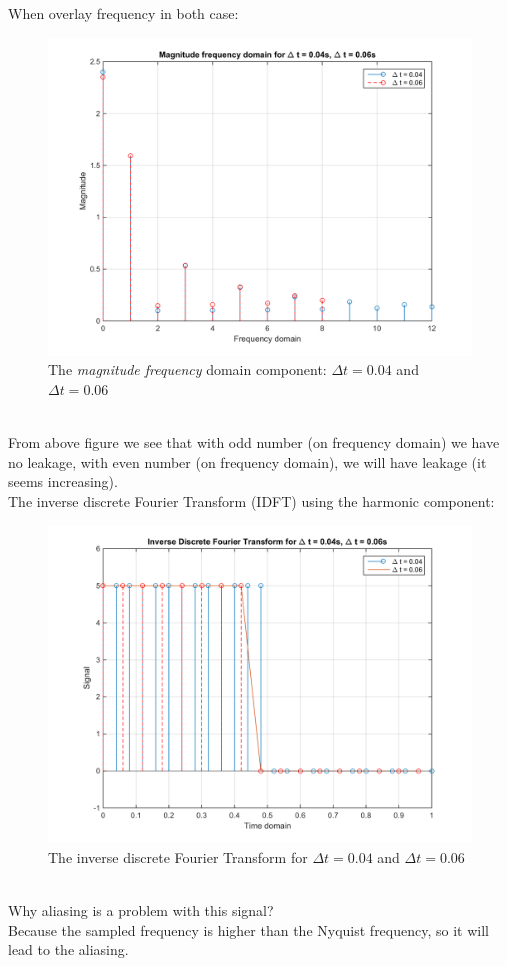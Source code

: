\documentclass[14pt,a4paper]{article}
\begin{document}
\begin{enumerate}
	When overlay frequency in both case:
	\begin{figure}[htp]
		\centering
		\includegraphics[scale=0.58]{fn3_VB2_3.png}
		\caption{The \textit{magnitude frequency} domain component: $\Delta t = 0.04$ and  $\Delta t = 0.06$}
	\end{figure}\\
	From above figure we see that with odd number (on frequency domain) we have no leakage, with even number (on frequency domain), we will have leakage (it seems increasing).\\
	The inverse discrete Fourier Transform (IDFT) using the harmonic component:
	\begin{figure}[htp]
		\centering
		\includegraphics[scale=0.58]{fn3_VB2_4.png}
		\caption{The inverse discrete Fourier Transform for $\Delta t = 0.04$ and $\Delta t = 0.06$}
	\end{figure}\\
	Why aliasing is a problem with this signal?\\
	Because the sampled frequency is higher than the Nyquist frequency, so it will lead to the aliasing.
	
	
\end{enumerate}
\pagebreak
\end{document}

